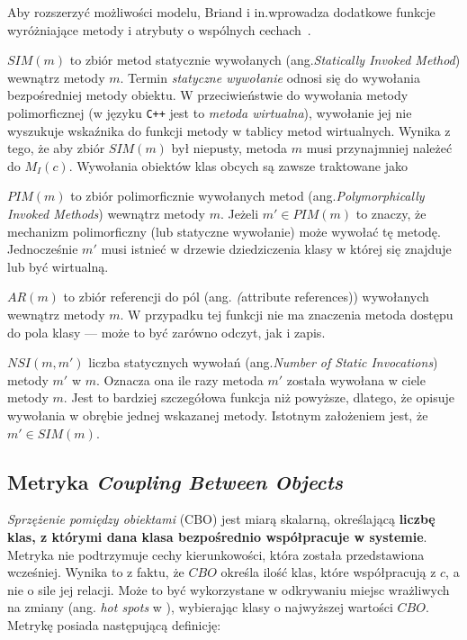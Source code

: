Aby rozszerzyć możliwości modelu, Briand i in.\@ wprowadza dodatkowe funkcje wyróżniające metody i
atrybuty o wspólnych cechach~\cite{briand1999unified}.

\textbf{\(SIM(m)\)} to zbiór metod statycznie wywołanych (ang.\@ \textit{Statically Invoked Method}) wewnątrz metody
\(m\).
Termin \textit{statyczne wywołanie} odnosi się do wywołania bezpośredniej metody obiektu.
W przeciwieństwie do wywołania metody polimorficznej (w języku \texttt{C++} jest to \textit{metoda wirtualna}),
wywołanie jej nie wyszukuje wskaźnika do funkcji metody w tablicy metod wirtualnych.
Wynika z tego, że aby zbiór \(SIM(m)\) był niepusty, metoda \(m\) musi przynajmniej należeć do \(M_{I}(c)\).
Wywołania obiektów klas obcych są zawsze traktowane jako

\(PIM(m)\) to zbiór polimorficznie wywołanych metod (ang.\@ \textit{Polymorphically Invoked Methods}) wewnątrz metody
\(m\).
Jeżeli \(m' \in PIM(m)\) to znaczy, że mechanizm polimorficzny (lub statyczne wywołanie) może wywołać tę metodę.
Jednocześnie \(m'\) musi istnieć w drzewie dziedziczenia klasy w której się znajduje lub być wirtualną.

\textbf{\(AR(m)\)} to zbiór referencji do pól (ang. \textit(attribute references)) wywołanych wewnątrz metody \(m\).
W przypadku tej funkcji nie ma znaczenia metoda dostępu do pola klasy --- może to być zarówno odczyt, jak i zapis.

\(NSI(m, m')\) liczba statycznych wywołań (ang.\@ \textit{Number of Static Invocations}) metody \(m'\) w \(m\).
Oznacza ona ile razy metoda \(m'\) została wywołana w ciele metody \(m\).
Jest to bardziej szczegółowa funkcja niż powyższe, dlatego, że opisuje wywołania w obrębie jednej wskazanej metody.
Istotnym założeniem jest, że \(m' \in SIM(m)\).

\subsection{Metryka \textit{Coupling Between Objects}}
\label{subsec:CBO}

\textit{Sprzężenie pomiędzy obiektami} (\acrshort{CBO}) jest miarą skalarną, określającą
\textbf{liczbę klas, z którymi dana klasa bezpośrednio współpracuje w systemie}.
Metryka nie podtrzymuje cechy kierunkowości, która została przedstawiona wcześniej.
Wynika to z faktu, że \(CBO\) określa ilość klas, które współpracują z \(c\), a nie o sile jej relacji.
Może to być wykorzystane w odkrywaniu miejsc wrażliwych na zmiany (ang. \textit{hot spots} w
\cite{feathers2004working}), wybierając klasy o najwyższej wartości \(CBO\).
Metrykę posiada następującą definicję:

